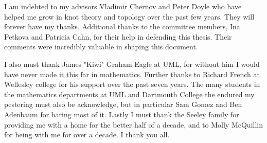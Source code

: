 I am indebted to my advisors Vladimir Chernov and Peter Doyle who have
helped me grow in knot theory and topology over the past few years. They will
forever have my thanks. Additional thanks to the committee members, Ina Petkova
and Patricia Cahn, for their help in defending this thesis. Their comments
were incredibly valuable in shaping this document.
\par\hfill\par
I also must thank James "Kiwi" Graham-Eagle at UML,
for without him I would have never made it this far in mathematics. Further
thanks to Richard French at Wellesley college for his support over the past
seven years. The many students in the mathematics departments at UML and
Dartmouth College the endured my pestering must also be acknowledge, but in
particular Sam Gomez and Ben Adenbaum for baring most of it. Lastly I must
thank the Seeley family for providing me with a home for the better half of a
decade, and to Molly McQuillin for being with me for over a decade. I thank you
all.

